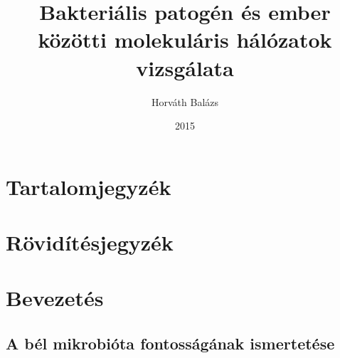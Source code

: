 \documentclass[a4paper,12pt]{article}
\title{Bakteriális patogén és ember közötti molekuláris hálózatok vizsgálata}
\author{Horváth Balázs}
\date{2015}
\begin{document}
\maketitle
\pagebreak

\section{Tartalomjegyzék}
\pagebreak

\section{Rövidítésjegyzék}
\pagebreak

\section{Bevezetés}
	\subsection{A bél mikrobióta fontosságának ismertetése}
\end{document}
